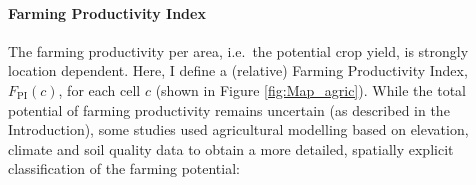 \paragraph{Farming Productivity Index}
The farming productivity per area, i.e.\ the potential crop yield, is strongly location dependent.
Here, I define a (relative) Farming Productivity Index, $F_\text{PI}(c)$, for each cell $c$ (shown in Figure \ref{fig:Map_agric}). 
While the total potential of farming productivity remains uncertain (as described in the Introduction), some studies used agricultural modelling based on elevation, climate and soil quality data to obtain a more detailed, spatially explicit classification of the farming potential:

